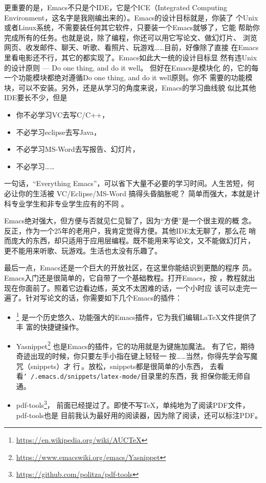 更重要的是，Emacs不只是个IDE，它是个ICE（Integrated Computing
Environment，这名字是我刚编出来的）。Emacs的设计目标就是，你装了
个Unix或者Linux系统，不需要装任何其它软件，只要装一个Emacs就够了，它能
帮助你完成所有的任务。也就是说，除了编程，你还可以用它写论文、做幻灯片、
浏览网页、收发邮件、聊天、听歌、看照片、玩游戏……目前，好像除了直接
在Emacs里看电影还不行，其它的都实现了。Emacs如此大一统的设计目标显
然有违Unix的设计原则 --- Do one thing, and do it well。 但好在Emacs是模块化
的，它的每一个功能模块都绝对遵循Do one thing, and do it well原则。你不
需要的功能模块，可以不安装。另外，还是从学习的角度来说，Emacs的学习曲线貌
似比其他IDE要长不少，但是
\begin{itemize}
\item 你不必学习VC去写C/C++，
\item 不必学习eclipse去写Java，
\item 不必学习MS-Word去写报告、幻灯片，
\item 不必学习……
\end{itemize}
一句话，“Everything Emacs”，可以省下大量不必要的学习时间。人生苦短，何
必让你的生活被 VC/Eclipse/MS-Word 搞得头昏脑胀呢？ 简单而强大，本就是计
科专业学生和非专业学生应有的不同 。

Emacs绝对强大，但方便与否就见仁见智了，因为“方便”是一个很主观的概
念。反正，作为一个25年的老用户，我肯定觉得方便。其他IDE太无聊了，那么花
哨而庞大的东西，却只适用于应用层编程。既不能用来写论文，又不能做幻灯片，
更不能用来听歌、玩游戏。生活也太没有乐趣了。

最后一点，Emacs还是一个巨大的开放社区，在这里你能结识到更酷的程序
员。Emacs入门还是很简单的，它自带了一个基础教程。打开Emacs，按
，教程就出现在你面前了。照着它边看边练，英文不太困难的话，一个小时应
该可以走完一遍了。针对写论文的话，你需要如下几个Emacs的插件：

\begin{itemize}
\item \auctex\footnote{\url{https://en.wikipedia.org/wiki/AUCTeX}}%
  是一个历史悠久、功能强大的Emacs插件，它为我们编辑\LaTeX{}文件提供了丰
  富的快捷键操作\cite{auctex}。
\item
  Yasnippet\footnote{\url{https://www.emacswiki.org/emacs/Yasnippet}}%
  也是Emacs的插件，它的功用就是为{\LKeyTab}键施加魔法\cite{yasnippet}。
  有了它，期待奇迹出现的时候，你只要左手小指在{\LKeyTab}键上轻轻一
  按……当然，你得先学会写魔咒（snippets）才
  行\,\Frowny{}。\label{p:yasnippet}放松，snippets都是很简单的小东西，
  去看看\texttt{\char`~/.emacs.d/snippets/latex-mode/}目录里的东西，我
  担保你能无师自通。
\item pdf-tools\footnote{\url{https://github.com/politza/pdf-tools}}，
  前面已经提过了。即使不写\TeX{}，单纯地为了阅读PDF文件，pdf-tools也是
  目前我认为最好用的阅读器，因为除了阅读，还可以标注PDF。
\end{itemize}

